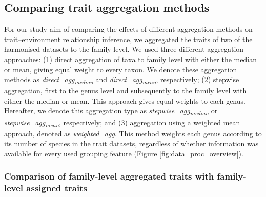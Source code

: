 \documentclass{article}
\begin{document}

\subsection*{Comparing trait aggregation methods}

For our study aim of comparing the effects of different aggregation methods on trait–environment relationship inference, we aggregated the traits of two of the harmonised datasets to the family level.
We used three different aggregation approaches: (1) direct aggregation of taxa to family level with either the median or mean, giving equal weight to every taxon. We denote these aggregation methods as \textit{direct\_agg\textsubscript{median}} and \textit{direct\_agg\textsubscript{mean}}, respectively; (2) stepwise aggregation, first to the genus level and subsequently to the family level with either the median or mean. This approach gives equal weights to each genus. Hereafter, we denote this aggregation type as \textit{stepwise\_agg\textsubscript{median}} or \textit{stepwise\_agg\textsubscript{mean}}, respectively; and (3) aggregation using a weighted mean approach, denoted as \textit{weighted\_agg}. This method weights each genus according to its number of species in the trait datasets, regardless of whether information was available for every used grouping feature (Figure \ref{fig:data_proc_overview}). 

\subsubsection*{Comparison of family-level aggregated traits with family-level assigned traits}
\end{document}
